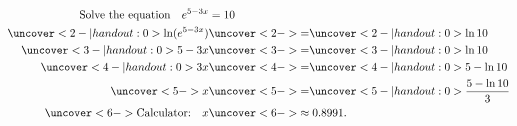 \begin{frame}
\begin{example}%
\begin{align*}
\text{Solve the equation} \quad e^{5-3x} & =  10 \\
\uncover<2-| handout:0>{\ln (e^{5-3x})} & \uncover<2->{=}  \uncover<2-| handout:0>{\ln 10} \\
\uncover<3-| handout:0>{5-3x} & \uncover<3->{=}  \uncover<3-| handout:0>{\ln 10} \\
\uncover<4-| handout:0>{3x} & \uncover<4->{=}  \uncover<4-| handout:0>{5-\ln 10} \\
\uncover<5->{x} & \uncover<5->{=}  \uncover<5-| handout:0>{\frac{5-\ln 10}{3}} \\
\uncover<6->{\text{Calculator:}\quad x} & \uncover<6->{\approx 0.8991.}
\end{align*}
\end{example}
\end{frame}
